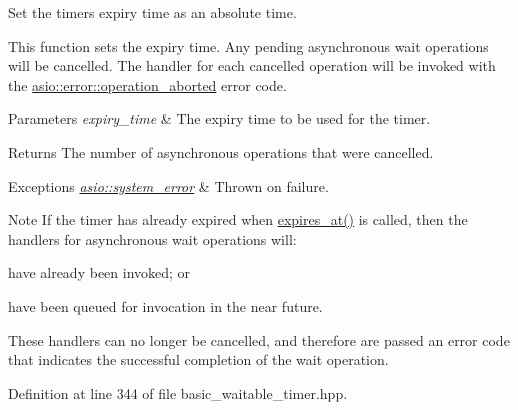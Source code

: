 Set the timer\textquotesingle{}s expiry time as an absolute time. 

This function sets the expiry time. Any pending asynchronous wait operations will be cancelled. The handler for each cancelled operation will be invoked with the \hyperlink{namespaceasio_1_1error_a2a69445eee784059ac2f4a6c4f5fe90dacde6760763051561f6c2ffc4ddf2be1b}{asio\+::error\+::operation\+\_\+aborted} error code.


\begin{DoxyParams}{Parameters}
{\em expiry\+\_\+time} & The expiry time to be used for the timer.\\
\hline
\end{DoxyParams}
\begin{DoxyReturn}{Returns}
The number of asynchronous operations that were cancelled.
\end{DoxyReturn}

\begin{DoxyExceptions}{Exceptions}
{\em \hyperlink{classasio_1_1system__error}{asio\+::system\+\_\+error}} & Thrown on failure.\\
\hline
\end{DoxyExceptions}
\begin{DoxyNote}{Note}
If the timer has already expired when \hyperlink{classasio_1_1basic__waitable__timer_abcc5c7ae917d2e7f02f6b6506997dae4}{expires\+\_\+at()} is called, then the handlers for asynchronous wait operations will\+:
\end{DoxyNote}
\begin{DoxyItemize}
\item have already been invoked; or\end{DoxyItemize}
\begin{DoxyItemize}
\item have been queued for invocation in the near future.\end{DoxyItemize}
These handlers can no longer be cancelled, and therefore are passed an error code that indicates the successful completion of the wait operation. 

Definition at line 344 of file basic\+\_\+waitable\+\_\+timer.\+hpp.

\hypertarget{classasio_1_1basic__waitable__timer_a53ae8940d9ccaefc4016e54c044f19ba}{}
